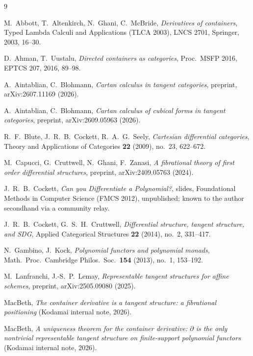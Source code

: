\documentclass[11pt]{article}
\theoremstyle{definition}
\begin{document}
\begin{thebibliography}{9}

M.~Abbott, T.~Altenkirch, N.~Ghani, C.~McBride,
\emph{Derivatives of containers},
Typed Lambda Calculi and Applications (TLCA 2003), LNCS 2701, Springer, 2003, 16--30.

D.~Ahman, T.~Uustalu,
\emph{Directed containers as categories},
Proc.\ MSFP 2016, EPTCS 207, 2016, 89--98.

A.~Aintablian, C.~Blohmann,
\emph{Cartan calculus in tangent categories},
preprint, arXiv:2607.11169 (2026).

A.~Aintablian, C.~Blohmann,
\emph{Cartan calculus of cubical forms in tangent categories},
preprint, arXiv:2609.05963 (2026).

R.~F.~Blute, J.~R.~B.~Cockett, R.~A.~G.~Seely,
\emph{Cartesian differential categories},
Theory and Applications of Categories \textbf{22} (2009), no.~23, 622--672.

M.~Capucci, G.~Cruttwell, N.~Ghani, F.~Zanasi,
\emph{A fibrational theory of first order differential structures},
preprint, arXiv:2409.05763 (2024).

J.~R.~B.~Cockett,
\emph{Can you Differentiate a Polynomial?},
slides, Foundational Methods in Computer Science (FMCS 2012), unpublished; known to the
author secondhand via a community relay.

J.~R.~B.~Cockett, G.~S.~H.~Cruttwell,
\emph{Differential structure, tangent structure, and SDG},
Applied Categorical Structures \textbf{22} (2014), no.~2, 331--417.

N.~Gambino, J.~Kock,
\emph{Polynomial functors and polynomial monads},
Math.\ Proc.\ Cambridge Philos.\ Soc.\ \textbf{154} (2013), no.~1, 153--192.

M.~Lanfranchi, J.-S.~P.~Lemay,
\emph{Representable tangent structures for affine schemes},
preprint, arXiv:2505.09080 (2025).

MacBeth,
\emph{The container derivative is a tangent structure: a fibrational positioning}
(Kodamai internal note, 2026).

MacBeth,
\emph{A uniqueness theorem for the container derivative: $\partial$ is the only nontrivial
representable tangent structure on finite-support polynomial functors}
(Kodamai internal note, 2026).

\end{thebibliography}
\end{document}
